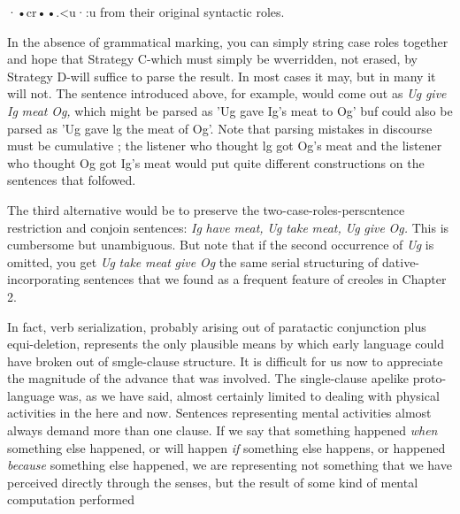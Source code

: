 ·•cr••.{\textless}u·:u from their original syntactic roles.

In the absence of grammatical marking, you can simply string case roles together and hope that Strategy C-which must simply be wverridden, not erased, by Strategy D-will suffice to parse the result. In most cases it may, but in many it will not. The sentence introduced above, for example, would come out as \textit{Ug} \textit{give} \textit{Ig} \textit{meat} \textit{Og,} which might be parsed as 'Ug gave Ig's meat to Og' buf could also be parsed as 'Ug gave lg the meat of Og'. Note that parsing mistakes in discourse must be cumulative ; the listener who thought lg got Og's meat and the listener who thought Og got Ig's meat would put quite different con\-structions on the sentences that folfowed.

The third alternative would be to preserve the two-case-roles-per\-scntence restriction and conjoin sentences: \textit{Ig} \textit{have} \textit{meat,} \textit{Ug} \textit{take} \textit{meat,} \textit{Ug} \textit{give} \textit{Og.} This is cumbersome but unambiguous. But note that if the second occurrence of \textit{Ug} is omitted, you get \textit{Ug} \textit{take} \textit{meat} \textit{give} \textit{Og\-} the same serial structuring of dative-incorporating sentences that we found as a frequent feature of creoles in Chapter 2.

In fact, verb serialization, probably arising out of paratactic con\-junction plus equi-deletion, represents the only plausible means by which early language could have broken out of smgle-clause structure. It is difficult for us now to appreciate the magnitude of the advance that was involved. The single-clause apelike proto-language was, as we have said, almost certainly limited to dealing with physical activities in the here and now. Sentences representing mental activities almost always demand more than one clause. If we say that something hap\-pened \textit{when} something else happened, or will happen \textit{if} something else happens, or happened \textit{because} something else happened, we are repre\-senting not something that we have perceived directly through the senses, but the result of some kind of mental computation performed


